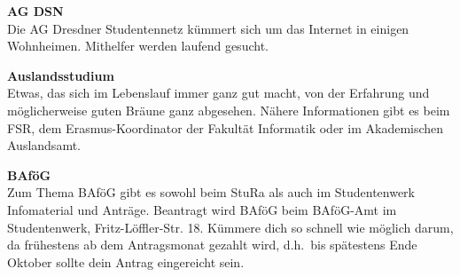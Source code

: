 
\begin{multicols}{2}

\textbf{AG DSN} \\
Die AG Dresdner Studentennetz kümmert sich um das Internet in einigen Wohnheimen.
Mithelfer werden laufend gesucht.~





\textbf{Auslandsstudium} \\
Etwas, das sich im Lebenslauf immer ganz gut macht, von der Erfahrung und möglicherweise guten Bräune ganz abgesehen.
Nähere Informationen gibt es beim FSR, dem Erasmus-Koordinator der Fakultät Informatik oder im Akademischen Auslandsamt.~


\textbf{BAföG} \\
Zum Thema BAföG gibt es sowohl beim StuRa als auch im Studentenwerk Infomaterial und Anträge.
Beantragt wird BAföG beim BAföG-Amt im Studentenwerk, Fritz-Löffler-Str. 18.
Kümmere dich so schnell wie möglich darum, da frühestens ab dem Antragsmonat gezahlt wird, d.h.\ bis spätestens Ende Oktober sollte dein Antrag eingereicht sein.~


\end{multicols}
